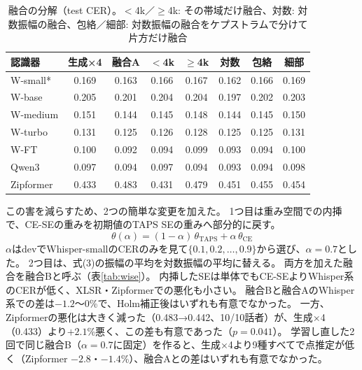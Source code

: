 \documentclass[xelatex,ja=standard,a4paper,twocolumn,10pt]{bxjsarticle}
\begin{document}
\begin{table}[t]
  \centering
  \caption{融合の分解（test CER）。$<$4k／$\geq$4k: その帯域だけ融合、対数: 対数振幅の融合、包絡／細部: 対数振幅の融合をケプストラムで分けて片方だけ融合}
  \label{tab:decomp}
  \footnotesize
  \setlength{\tabcolsep}{2.2pt}
  \begin{tabular}{lccccccc}
    \toprule
    認識器 & 生成×4 & 融合A & $<$4k & $\geq$4k & 対数 & 包絡 & 細部 \\
    \midrule
    W-small* & 0.169 & 0.163 & 0.166 & 0.167 & 0.162 & 0.166 & 0.169 \\
    W-base & 0.205 & 0.201 & 0.204 & 0.204 & 0.197 & 0.202 & 0.203 \\
    W-medium & 0.151 & 0.144 & 0.145 & 0.148 & 0.144 & 0.145 & 0.150 \\
    W-turbo & 0.131 & 0.125 & 0.126 & 0.128 & 0.125 & 0.125 & 0.131 \\
    W-FT & 0.100 & 0.092 & 0.094 & 0.099 & 0.093 & 0.094 & 0.100 \\
    Qwen3 & 0.097 & 0.094 & 0.097 & 0.094 & 0.093 & 0.094 & 0.098 \\
    Zipformer & 0.433 & 0.483 & 0.431 & 0.479 & 0.451 & 0.455 & 0.454 \\
    \bottomrule
  \end{tabular}
\end{table}

この害を減らすため、2つの簡単な変更を加えた。
1つ目は重み空間での内挿\cite{wiseft}で、CE-SEの重みを初期値のTAPS SEの重みへ部分的に戻す。
\begin{equation}
  \theta(\alpha) = (1-\alpha)\,\theta_\mathrm{TAPS} + \alpha\,\theta_\mathrm{CE}
\end{equation}
$\alpha$はdevでWhisper-smallのCERのみを見て$\{0.1, 0.2, \ldots, 0.9\}$から選び、$\alpha=0.7$とした。
2つ目は、式(3)の振幅の平均を対数振幅の平均に替える。
両方を加えた融合を融合Bと呼ぶ（表\ref{tab:wise}）。
内挿したSEは単体でもCE-SEよりWhisper系のCERが低く、XLSR・Zipformerでの悪化も小さい。
融合Bと融合AのWhisper系での差は$-1.2$〜0\%で、Holm補正後はいずれも有意でなかった。
一方、Zipformerの悪化は大きく減った（0.483→0.442、10/10話者）が、生成×4（0.433）より$+2.1$\%悪く、この差も有意であった（$p=0.041$）。
学習し直した2回で同じ融合B（$\alpha=0.7$に固定）を作ると、生成×4より9種すべてで点推定が低く（Zipformer $-2.8$・$-1.4$\%）、融合Aとの差はいずれも有意でなかった。
\end{document}
